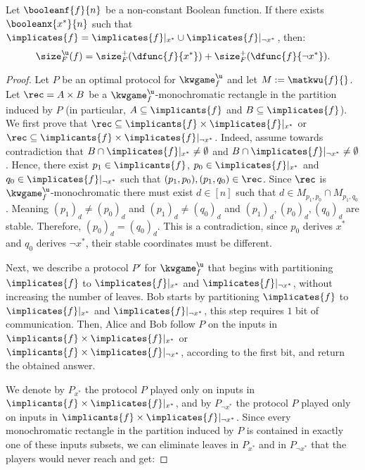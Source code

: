 \documentclass[acmsmall, nonacm, authorversion]{acmart}
\begin{document}
\begin{proposition}\label{prop:lower-bound-partition-x}
Let $\booleanf{f}{n}$ be a non-constant Boolean function. If there exists $\booleanx{x^*}{n}$ such that $\implicates{f}=\implicates{f}|_{x^*}\cup \implicates{f}|_{\neg x^*}$, then:
\[
\size_{F}^\u(f)=\size_{F}^+(\dfunc{f}{x^*})+\size_{F}^+(\dfunc{f}{\neg x^*}).
\]
\end{proposition}
\begin{proof}
Let $P$ be an optimal protocol for $\kwgame_f^\u$ and let $M:=\matkwu{f}{}$. Let $\rec=A\times B$ be a $\kwgame_f^\u$-monochromatic rectangle in the partition induced by $P$ (in particular, $A\subseteq \implicants{f}$ and $B\subseteq \implicates{f}$).
We first prove that $\rec\subseteq \implicants{f}\times \implicates{f}|_{x^*}$ or $\rec\subseteq \implicants{f}\times \implicates{f}|_{\neg x^*}$.
Indeed, assume towards contradiction that $B\cap \implicates{f}|_{x^*} \neq \emptyset$ and $B\cap \implicates{f}|_{\neg x^*}\neq\emptyset$. Hence, there exist $p_1\in \implicants{f}$, $p_0\in \implicates{f}|_{x^*}$ and $q_0 \in \implicates{f}|_{\neg x^*}$ such that $(p_1,p_0),(p_1,q_0)\in \rec$. Since $\rec$ is $\kwgame_f^\u$-monochromatic there must exist $d\in [n]$ such that $d\in M_{p_1,p_0} \cap M_{p_1,q_0}$. Meaning $(p_1)_d\neq (p_0)_d$ and $(p_1)_d\neq (q_0)_d$ and $(p_1)_d,(p_0)_d,(q_0)_d$ are stable. Therefore, $(p_0)_d=(q_0)_d$. This is a contradiction, since $p_0$ derives $x^*$ and $q_0$ derives $\neg x^*$, their stable coordinates must be different.

Next, we describe a protocol $P'$ for $\kwgame_f^\u$ that begins with partitioning $\implicates{f}$ to $\implicates{f}|_{x^*}$ and $\implicates{f}|_{\neg x^*}$, without increasing the number of leaves. Bob starts by partitioning $\implicates{f}$ to $\implicates{f}|_{x^*}$ and $\implicates{f}|_{\neg x^*}$, this step requires $1$ bit of communication. Then, Alice and Bob follow $P$ on the inputs in $\implicants{f}\times \implicates{f}|_{x^*}$ or $\implicants{f}\times \implicates{f}|_{\neg x^*}$, according to the first bit, and return the obtained answer.

We denote by $P_{x^*}$ the protocol $P$ played only on inputs in $\implicants{f}\times \implicates{f}|_{x^*}$, and by $P_{\neg x^*}$ the protocol $P$ played only on inputs in $\implicants{f}\times \implicates{f}|_{\neg x^*}$. Since every monochromatic rectangle in the partition induced by $P$ is contained in exactly one of these inputs subsets, we can eliminate leaves in $P_{x^*}$ and in $P_{\neg x^*}$ that the players would never reach and get:


\end{proof}
\end{document}
